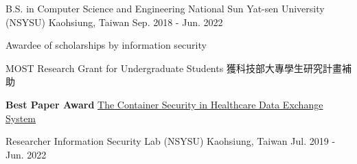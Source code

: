 

\begin{cventries}

  \cventry
  {B.S. in Computer Science and Engineering} %
  {National Sun Yat-sen University (NSYSU)} %
  {Kaohsiung, Taiwan} %
  {Sep. 2018 - Jun. 2022} %
  {
    \begin{cvitems} %
      \item {Awardee of scholarships by information security}
      \item {MOST Research Grant for Undergraduate Students 獲科技部大專學生研究計畫補助}
      \item {\textbf{Best Paper Award} \href{https://github.com/25077667/Container_Security}{The Container Security in Healthcare Data Exchange System}}
    \end{cvitems}
  }

  \cventry
  {Researcher}
  {Information Security Lab (NSYSU)}
  {Kaohsiung, Taiwan} %
  {Jul. 2019 - Jun. 2022} %
  {}

\end{cventries}
